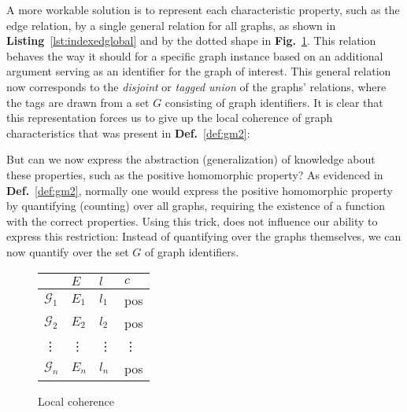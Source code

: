\documentclass{article}
\theoremstyle{definition}
\newcommand{\graph}[1]{\ensuremath{\mathcal{#1}}}
\begin{document}
A more workable solution is to represent each characteristic property, such as the edge relation, by a single general relation for all graphs, as shown in \textbf{Listing}~\ref{lst:indexedglobal} and by the dotted shape in \textbf{Fig.}~\ref{fig:LocalCoherence}.
This relation behaves the way it should for a specific graph instance based on an additional argument serving as an identifier for the graph of interest.
This general relation now corresponds to the \emph{disjoint} or \emph{tagged union} of the graphs' relations, where the tags are drawn from a set $G$ consisting of graph identifiers.
It is clear that this representation forces us to give up the local coherence of graph characteristics that was present in \textbf{Def.}~\ref{def:gm2}: 


But can we now express the abstraction (generalization) of knowledge about these properties, such as the positive homomorphic property?
As evidenced in \textbf{Def.}~\ref{def:gm2}, normally one would express the positive homomorphic property by quantifying (counting) over all graphs, requiring the existence of a function with the correct properties.
Using this trick, does not influence our ability to express this restriction: Instead of quantifying over the graphs themselves, we can now quantify over the set $G$ of graph identifiers.

\begin{figure}[h]
\centering
\begin{tabular}{l |l l l}
         & $E$ & $l$      & $c$ \\
\hline
$\graph{G}_{1}$  & $E_{1}$ & $l_{1}$ & pos\\
$\graph{G}_{2}$  & $E_{2}$ & $l_{2}$ & pos\\
  \vdots & \vdots  & \vdots  & \vdots\\
$\graph{G}_{n}$  & $E_{n}$ & $l_{n}$ & pos\\
\end{tabular}
\caption{Local coherence\label{fig:LocalCoherence}}
\end{figure}
\end{document}
